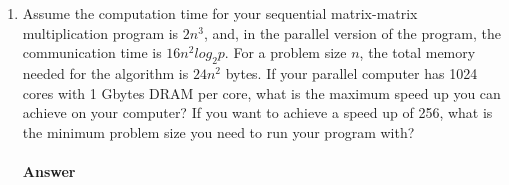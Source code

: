 \documentclass[10pt]{scrartcl}
\begin{document}
\begin{enumerate}
 
 \item Assume the computation time for your sequential matrix-matrix multiplication program is $2n^3$, and, in the parallel version of the program, the communication time is $16n^2log_2p$. For a problem size $n$, the total memory needed for the algorithm is $24n^2$ bytes. If your parallel computer has 1024 cores with 1 Gbytes DRAM per core, what is the maximum speed up you can achieve on your computer? If you want to achieve a speed up of 256, what is the minimum problem size you need to run your program with?\\
 \\ 
 \textbf{Answer}\\
 \\
 
\end{enumerate}
\end{document}
